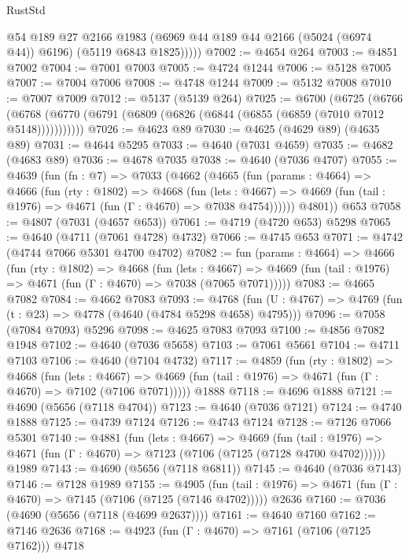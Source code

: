 \begin{lexlean}{RustStd}
\begin{coremodule}
            @54
            @189
            @27
            @2166
            @1983
            (@6969 @44 @189 @44 @2166 (@5024 (@6974 @44)) @6196)
            (@5119 @6843 @1825)))))
@7002 := @4654 @264
@7003 := @4851 @7002
@7004 := @7001 @7003
@7005 := @4724 @1244
@7006 := @5128 @7005
@7007 := @7004 @7006
@7008 := @4748 @1244
@7009 := @5132 @7008
@7010 := @7007 @7009
@7012 := @5137 (@5139 @264)
@7025 := @6700
    (@6725
      (@6766 (@6768 (@6770 (@6791 (@6809 (@6826 (@6844 (@6855 (@6859 (@7010 @7012 @5148)))))))))))
@7026 := @4623 @89
@7030 := @4625 (@4629 @89) (@4635 @89)
@7031 := @4644 @5295
@7033 := @4640 (@7031 @4659)
@7035 := @4682 (@4683 @89)
@7036 := @4678 @7035
@7038 := @4640 (@7036 @4707)
@7055 := @4639
    (fun (fn : @7) =>
    @7033
      (@4662
        (@4665
          (fun (params : @4664) =>
          @4666
            (fun (rty : @1802) =>
            @4668
              (fun (lets : @4667) =>
              @4669 (fun (tail : @1976) => @4671 (fun (Γ : @4670) => @7038 @4754))))))
        @4801))
    @653
@7058 := @4807 (@7031 (@4657 @653))
@7061 := @4719 (@4720 @653) @5298
@7065 := @4640 (@4711 (@7061 @4728) @4732)
@7066 := @4745 @653
@7071 := @4742 (@4744 @7066 @5301 @4700 @4702)
@7082 := fun (params : @4664) =>
  @4666
    (fun (rty : @1802) =>
    @4668
      (fun (lets : @4667) =>
      @4669 (fun (tail : @1976) => @4671 (fun (Γ : @4670) => @7038 (@7065 @7071)))))
@7083 := @4665 @7082
@7084 := @4662 @7083
@7093 := @4768 (fun (U : @4767) => @4769 (fun (t : @23) => @4778 (@4640 (@4784 @5298 @4658) @4795)))
@7096 := @7058 (@7084 @7093) @5296
@7098 := @4625 @7083 @7093
@7100 := @4856 @7082 @1948
@7102 := @4640 (@7036 @5658)
@7103 := @7061 @5661
@7104 := @4711 @7103
@7106 := @4640 (@7104 @4732)
@7117 := @4859
    (fun (rty : @1802) =>
    @4668
      (fun (lets : @4667) =>
      @4669 (fun (tail : @1976) => @4671 (fun (Γ : @4670) => @7102 (@7106 @7071)))))
    @1888
@7118 := @4696 @1888
@7121 := @4690 (@5656 (@7118 @4704))
@7123 := @4640 (@7036 @7121)
@7124 := @4740 @1888
@7125 := @4739 @7124
@7126 := @4743 @7124
@7128 := @7126 @7066 @5301
@7140 := @4881
    (fun (lets : @4667) =>
    @4669
      (fun (tail : @1976) => @4671 (fun (Γ : @4670) => @7123 (@7106 (@7125 (@7128 @4700 @4702))))))
    @1989
@7143 := @4690 (@5656 (@7118 @6811))
@7145 := @4640 (@7036 @7143)
@7146 := @7128 @1989
@7155 := @4905
    (fun (tail : @1976) => @4671 (fun (Γ : @4670) => @7145 (@7106 (@7125 (@7146 @4702)))))
    @2636
@7160 := @7036 (@4690 (@5656 (@7118 (@4699 @2637))))
@7161 := @4640 @7160
@7162 := @7146 @2636
@7168 := @4923 (fun (Γ : @4670) => @7161 (@7106 (@7125 @7162))) @4718

\end{coremodule}
\end{lexlean}
